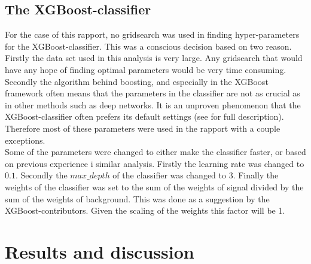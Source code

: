 \documentclass{article}
\begin{document}
\subsection{The XGBoost-classifier}
For the case of this rapport, no gridsearch was used in finding hyper-parameters for the XGBoost-classifier. This was a conscious decision based on two reason. Firstly the data set used in this analysis is very large. Any gridsearch that would have any hope of finding optimal parameters would be very time consuming. Secondly the algorithm behind boosting, and especially in the XGBoost framework often means that the parameters in the classifier are not as crucial as in other methods such as deep networks. It is an unproven phenomenon that the XGBoost-classifier often prefers its default settings (see \cite{XGB} for full description). Therefore most of these parameters were used in the rapport with a couple exceptions.
\\
Some of the parameters were changed to either make the classifier faster, or based on previous experience i similar analysis. Firstly the learning rate was changed to $0.1$. Secondly the $max\_depth$ of the classifier was changed to 3. Finally the weights of the classifier was set to the sum of the weights of signal divided by the sum of the weights of background. This was done as a suggestion by the XGBoost-contributors. Given the scaling of the weights this factor will be 1. 
\section{Results and discussion}
\end{document}

